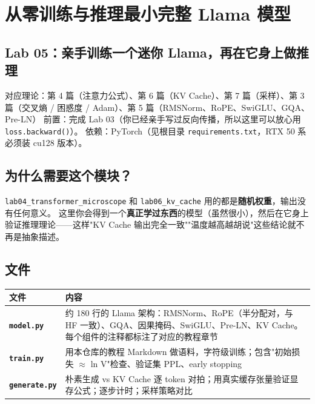 \chapter{从零训练与推理最小完整 Llama 模型}

\section{Lab 05：亲手训练一个迷你 Llama，再在它身上做推理}

\begin{warningBox}[避坑指南与核心警示]
对应理论：第 4 篇（注意力公式）、第 6 篇（KV Cache）、第 7 篇（采样）、第 3 篇（交叉熵 / 困惑度 / Adam）、第 5 篇（RMSNorm、RoPE、SwiGLU、GQA、Pre-LN）
前置：完成 Lab 03（你已经亲手写过反向传播，所以这里可以放心用 \texttt{loss.backward()}）。
依赖：PyTorch（见根目录 \texttt{requirements.txt}，RTX 50 系必须装 cu128 版本）。
\end{warningBox}

\section{为什么需要这个模块？}

\texttt{lab04\_transformer\_microscope} 和 \texttt{lab06\_kv\_cache} 用的都是\textbf{随机权重}，输出没有任何意义。
这里你会得到一个\textbf{真正学过东西}的模型（虽然很小），然后在它身上验证推理理论——这样"KV Cache 输出完全一致""温度越高越胡说"这些结论就不再是抽象描述。

\section{文件}

\begin{center}
\small
\begin{tabularx}{\textwidth}{p{3.5cm} X}
\toprule
\textbf{文件} & \textbf{内容} \\
\midrule
{}\textbf{\texttt{model.py}} & 约 180 行的 Llama 架构：RMSNorm、RoPE（半分配对，与 HF 一致）、GQA、因果掩码、SwiGLU、Pre-LN、KV Cache。每个组件的注释都标注了对应的教程章节 \\
{}\textbf{\texttt{train.py}} & 用本仓库的教程 Markdown 做语料，字符级训练；包含"初始损失 $\approx$ ln V"检查、验证集 PPL、early stopping \\
{}\textbf{\texttt{generate.py}} & 朴素生成 vs KV Cache 逐 token 对拍；用真实缓存张量验证显存公式；逐步计时；采样策略对比 \\
\bottomrule
\end{tabularx}
\end{center}

